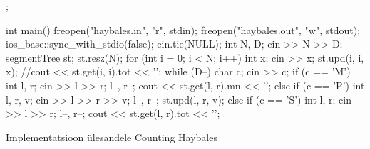 \documentclass{trkut}
\theoremstyle{definition}
\begin{document}
\begin{cclol}
{};

int main() {
  freopen("haybales.in", "r", stdin);
  freopen("haybales.out", "w", stdout);
  ios_base::sync_with_stdio(false);
  cin.tie(NULL);
  int N, D;
  cin >> N >> D;
  segmentTree st;
  st.resz(N);
  for (int i = 0; i < N; i++) {
    int x;
    cin >> x;
    st.upd(i, i, x);
    //cout << st.get(i, i).tot << '\n';
  }
  while (D--) {
    char c;
    cin >> c;
    if (c == 'M') {
      int l, r;
      cin >> l >> r;
      l--, r--;
      cout << st.get(l, r).mn << '\n';
    } else if (c == 'P') {
      int l, r, v;
      cin >> l >> r >> v;
      l--, r--;
      st.upd(l, r, v);
    } else if (c == 'S') {
      int l, r;
      cin >> l >> r;
      l--, r--;
      cout << st.get(l, r).tot << '\n';
    }
  }
}
\end{cclol}
 \begin{kk}[H]%
    \caption{Implementatsioon ülesandele Counting Haybales}%
    \label{EMaxx}%
    \end{kk}
\end{document}

